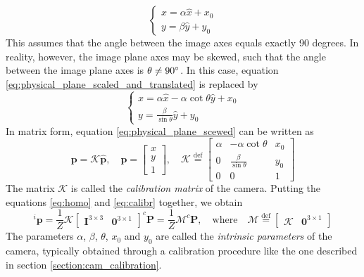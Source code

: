 \begin{equation}
\label{eq:physical_plane_scaled_and_translated}
    \begin{cases}
    x=\alpha\hat{x}+x_0\\
    y=\beta\hat{y}+y_0
    \end{cases}
\end{equation}
This assumes that the angle between the image axes equals exactly 90 degrees. In reality, however, the image plane axes may be skewed, such that the angle between the image plane axes is $\theta\neq90\degree$. In this case, equation \ref{eq:physical_plane_scaled_and_translated} is replaced by
\begin{equation}
\label{eq:physical_plane_scewed}
    \begin{cases}
    x=\alpha\hat{x}-\alpha\cot{\theta}\hat{y}+x_0\\
    y=\frac{\beta}{\sin{\theta}}\hat{y}+y_0
    \end{cases}
\end{equation}
In matrix form, equation \ref{eq:physical_plane_scewed} can be written as
\begin{equation}
\label{eq:calibr}
    \mathbf{p}=\mathcal{K}\mathbf{\hat{p}}, \quad \mathbf{p}=\begin{bmatrix}x\\y\\1\end{bmatrix},\quad \mathcal{K}\overset{\text{def}}{=}\begin{bmatrix}\alpha & -\alpha\cot{\theta} & x_0\\0 & \frac{\beta}{\sin{\theta}} & y_0\\0 & 0 & 1\end{bmatrix}
\end{equation}
The matrix $\mathcal{K}$ is called the \textit{calibration matrix} of the camera. Putting the equations \ref{eq:homo} and \ref{eq:calibr} together, we obtain
\begin{equation}
\label{eq:intrinsics}
    ^i\mathbf{p}=\frac{1}{Z}\mathcal{K}\begin{bmatrix}\mathbf{I}^{3\times3} & \mathbf{0}^{3\times1}\end{bmatrix}^c\mathbf{P}=\frac{1}{Z}\mathcal{M}^c\mathbf{P},\quad \text{where}\quad \mathcal{M}\overset{\text{def}}{=}\begin{bmatrix}\mathcal{K} & \mathbf{0}^{3\times1}\end{bmatrix}
\end{equation}
The parameters $\alpha$, $\beta$, $\theta$, $x_0$ and $y_0$ are called the \textit{intrinsic parameters} of the camera, typically obtained through a calibration procedure like the one described in section \ref{section:cam_calibration}.
